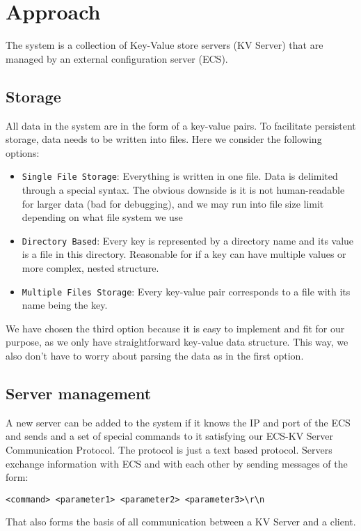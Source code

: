 \documentclass[sigconf]{acmart}
\begin{document}
\section{Approach}
The system is a collection of Key-Value store servers (KV Server) that are managed by an external configuration server (ECS).

\subsection{Storage}
All data in the system are in the form of a key-value pairs. To facilitate persistent storage, data needs to be written into files. Here we consider the following options:
\begin{itemize}
	\item {\verb|Single File Storage|}: Everything is written in one file. Data is delimited through a special syntax. The obvious downside is it is not human-readable for larger data (bad for debugging), and we may run into file size limit depending on what file system we use
	\item{\verb|Directory Based|}: Every key is represented by a directory name and its value is a file in this directory. Reasonable for if a key can have multiple values or more complex, nested structure.
	\item{\verb|Multiple Files Storage|}: Every key-value pair corresponds to a file with its name being the key.
\end{itemize}
We have chosen the third option because it is easy to implement and fit for our purpose, as we only have straightforward key-value data structure. This way, we also don't have to worry about parsing the data as in the first option.

\subsection{Server management}
A new server can be added to the system if it knows the IP and port of the ECS and sends and a set of special commands to it satisfying our ECS-KV Server Communication Protocol. The protocol is just a text based protocol. Servers exchange information with ECS and with each other by sending messages of the form:
\begin{verbatim}
<command> <parameter1> <parameter2> <parameter3>\r\n
\end{verbatim}

That also forms the basis of all communication between a KV Server and a client.
\end{document}
